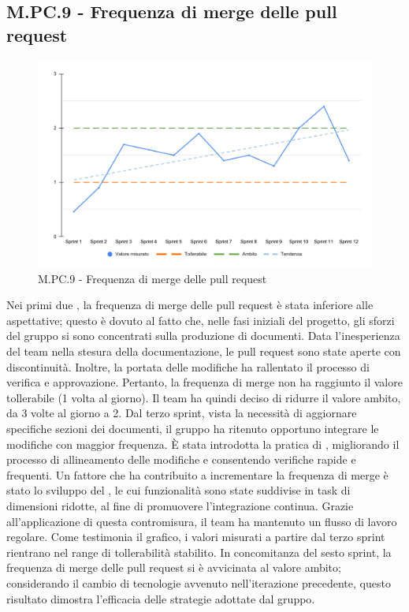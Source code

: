 \subsection{M.PC.9 - Frequenza di merge delle pull request}
\begin{figure}[H]
    \centering
    \includegraphics[width=\textwidth]{assets/frequenza_pull_request.pdf}
    \caption{M.PC.9 - Frequenza di merge delle pull request}
\end{figure}

\par Nei primi due , la frequenza di merge delle pull request è stata inferiore alle aspettative; questo è dovuto al fatto che, nelle fasi iniziali del progetto, gli sforzi del gruppo si sono concentrati sulla produzione di documenti. Data l'inesperienza del team nella stesura della documentazione, le pull request sono state aperte con discontinuità. Inoltre, la portata delle modifiche ha rallentato il processo di verifica e approvazione. Pertanto, la frequenza di merge non ha raggiunto il valore tollerabile (1 volta al giorno). Il team ha quindi deciso di ridurre il valore ambito, da 3 volte al giorno a 2. Dal terzo sprint, vista la necessità di aggiornare specifiche sezioni dei documenti, il gruppo ha ritenuto opportuno integrare le modifiche con maggior frequenza. È stata introdotta la pratica di , migliorando il processo di allineamento delle modifiche e consentendo verifiche rapide e frequenti. Un fattore che ha contribuito a incrementare la frequenza di merge è stato lo sviluppo del , le cui funzionalità sono state suddivise in task di dimensioni ridotte, al fine di promuovere l'integrazione continua. Grazie all'applicazione di questa contromisura, il team ha mantenuto un flusso di lavoro regolare. Come testimonia il grafico, i valori misurati a partire dal terzo sprint rientrano nel range di tollerabilità stabilito. In concomitanza del sesto sprint, la frequenza di merge delle pull request si è avvicinata al valore ambito; considerando il cambio di tecnologie avvenuto nell'iterazione precedente, questo risultato dimostra l'efficacia delle strategie adottate dal gruppo.

